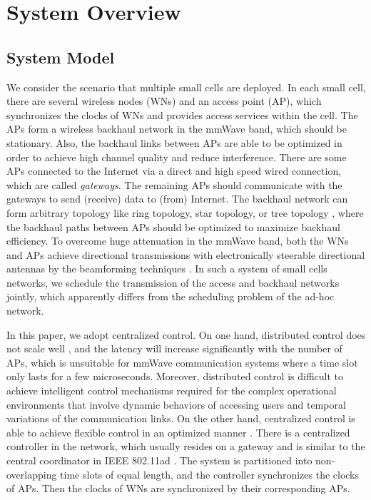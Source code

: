 \documentclass[journal]{IEEEtran}
\begin{document}
\section{System Overview}\label{S3}


\subsection{System Model}\label{S3-1}

We consider the scenario that multiple small cells are deployed. In each small cell, there are
several wireless nodes (WNs) and an access point (AP), which synchronizes the clocks of WNs and
provides access services within the cell. The APs form a wireless backhaul network in the mmWave band,
which should be stationary. Also, the backhaul links between APs are able to be optimized in order
to achieve high channel quality and reduce interference. There are some APs connected to the
Internet via a direct and high speed wired connection, which are called \emph{gateways}. The
remaining APs should communicate with the gateways to send (receive) data to (from) Internet. The
backhaul network can form arbitrary topology like ring topology, star topology, or tree topology
\cite{ICTON 2012}, where the backhaul paths between APs should be optimized to maximize backhaul
efficiency. To overcome huge attenuation in the mmWave band, both the WNs and APs achieve directional transmissions with electronically steerable
directional antennas by the beamforming techniques \cite{MRDMAC, hua2}. In such a system of small cells networks, we
schedule the transmission of the access and backhaul networks jointly, which apparently differs
from the scheduling problem of the ad-hoc network.


In this paper, we adopt centralized control. On one hand, distributed control does not scale well \cite{SoftRAN}, and the latency will increase significantly with the number of APs, which is unsuitable for mmWave communication systems where a time slot only lasts for a few microseconds. Moreover, distributed control is difficult to achieve intelligent control mechanisms required for the complex operational environments that involve dynamic behaviors of accessing users and temporal variations of the communication links. On the other hand, centralized control is able to achieve flexible control in an optimized manner \cite{mobicom_poster}. There is a centralized controller in the network, which usually resides on a gateway and is similar to the central coordinator in IEEE 802.11ad \cite{IEEE 802.11ad}. The system is partitioned into non-overlapping time slots of equal length, and the controller
synchronizes the clocks of APs. Then the clocks of WNs are synchronized by their corresponding APs.
\end{document}
